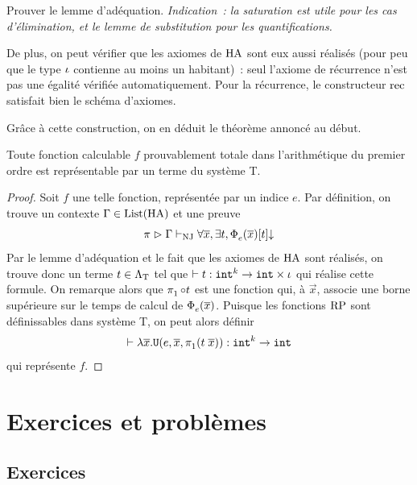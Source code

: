 \begin{exercise}
  Prouver le lemme d'adéquation. \textit{Indication~: la saturation
    est utile pour les cas d'élimination, et le lemme de substitution
    pour les quantifications.}
\end{exercise}

De plus, on peut vérifier que les axiomes de $\operatorname{HA}$ sont eux aussi
réalisés (pour peu que le type $\iota$ contienne au moins un habitant)~:
seul l'axiome de récurrence n'est pas une égalité vérifiée automatiquement.
Pour la récurrence, le constructeur $\operatorname{rec}$ satisfait bien le schéma
d'axiomes.

Grâce à cette construction, on en déduit le théorème annoncé au début.

\begin{theorem}
  Toute fonction calculable $f$ prouvablement totale dans l'arithmétique
  du premier ordre est représentable par un terme du système T.
\end{theorem}

\begin{proof}
  Soit $f$ une telle fonction, représentée par un indice $e$. Par définition,
  on trouve un contexte $\Gamma\in\operatorname{List}(\operatorname{HA})$ et une preuve
  \[\pi\mathrel{\rhd} \Gamma\vdash_{\operatorname{NJ}} \forall \overline{x}, \exists t,
  \operatorname{\Phi}_{e}^{}(\overline{x})[t]\mathbin{\downarrow}\]
  Par le lemme d'adéquation et le fait que les axiomes de $\operatorname{HA}$ sont réalisés,
  on trouve donc un terme $t\in\Lambda_{\mathrm{T}}$ tel que
  $\mathrel{\vdash} t : {\normalfont\texttt{int}}^k \to {\normalfont\texttt{int}}\times \iota$ qui réalise cette formule.
  On remarque alors que $\mathop{\pi_{1}^{}}\circ t$ est une fonction qui, à
  $\vec x$, associe une borne supérieure sur le temps de calcul de
  $\operatorname{\Phi}_{e}^{}(\overline{x})$. Puisque les fonctions $\operatorname{RP}$ sont définissables dans
  système T, on peut alors définir
  \[\mathrel{\vdash} \lambda \overline{x}.{\normalfont\texttt{U}}(e,\overline{x},\mathop{\pi_{1}^{}}(t\;\overline{x})) :
  {\normalfont\texttt{int}}^k \to {\normalfont\texttt{int}}\]
  qui représente $f$.
\end{proof}

\clearpage

\section{Exercices et problèmes}

\subsection{Exercices}

